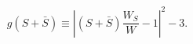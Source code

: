 \begin{equation}
g(S+\bar S) \equiv | (S + \bar S)\frac{W_S}{W}-1|^2 -3 .
\label{def-g-0}
\end{equation}

